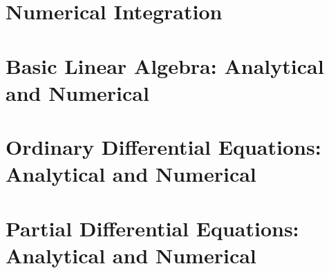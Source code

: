 \section{Numerical Integration}
\section{Basic Linear Algebra: Analytical and Numerical}
\section{Ordinary Differential Equations: Analytical and Numerical}
\section{Partial Differential Equations: Analytical and Numerical}
